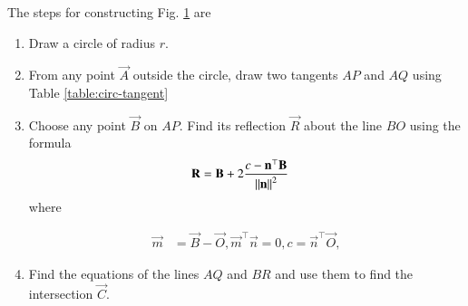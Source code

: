 \documentclass[journal,12pt,twocolumn]{IEEEtran}
\renewcommand\thesection{\arabic{section}}
\begin{document}
\begin{enumerate}[label=\thesection.\arabic*.,ref=\thesection.\theenumi]
\begin{figure}
	  \caption{}
	  \label{fig:matrix-10-15.pdf}
	  \end{figure}
     \solution The steps for constructing Fig.
	  \ref{fig:matrix-10-15.pdf}
	  are
	  \begin{enumerate}
		  \item Draw a circle of radius $r$.
		  \item From any point $\vec{A}$ outside the circle, draw two tangents $AP$ and $AQ$
	using Table \ref{table:circ-tangent}
\item Choose any point $\vec{B}$ on $AP$.   Find its reflection $\vec{R}$ about the line $BO$ using the formula
		\begin{align}
			\mathbf{R} &=
	  \mathbf{B} + 2\frac{c - \mathbf{n}^{\top}\mathbf{B}}{\left\lVert\mathbf{n}\right\rVert^2}
			\label{eq:image_pt_plane}
		\end{align}
		where 

		\begin{align}
			\vec{m} &= 
			\vec{B}- 
			\vec{O},
			\vec{m}^{\top}\vec{n}  = 0,
			c = 
			\vec{n}^{\top}\vec{O},
		\end{align}
	\item Find the equations of the lines $AQ$ and $BR$ and use them to find the intersection $\vec{C}$.
	

\end{enumerate}
\end{enumerate}
\end{document}
